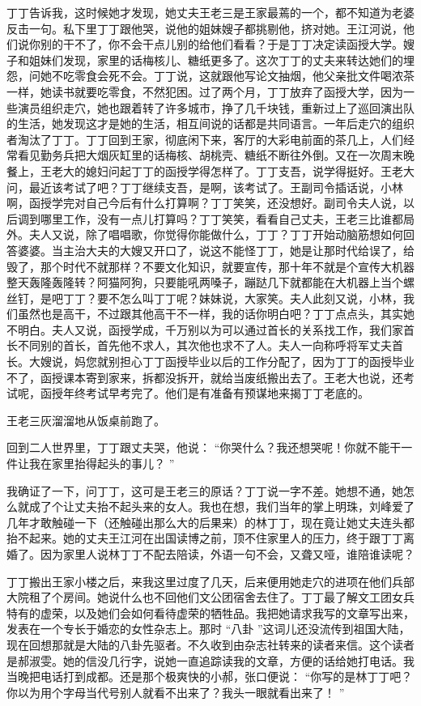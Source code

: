 \documentclass[12pt,twoside,openany]{book}
\begin{document}
丁丁告诉我，这时候她才发现，她丈夫王老三是王家最蔫的一个，都不知道为老婆反击一句。私下里丁丁跟他哭，说他的姐妹嫂子都挑剔他，挤对她。王江河说，他们说你别的干不了，你不会干点儿别的给他们看看？于是丁丁决定读函授大学。嫂子和姐妹们发现，家里的话梅核儿、糖纸更多了。这次丁丁的丈夫来转达她们的埋怨，问她不吃零食会死不会。丁丁说，这就跟他写论文抽烟，他父亲批文件喝浓茶一样，她读书就要吃零食，不然犯困。过了两个月，丁丁放弃了函授大学，因为一些演员组织走穴，她也跟着转了许多城市，挣了几千块钱，重新过上了巡回演出队的生活，她发现这才是她的生活，相互间说的话都是共同语言。一年后走穴的组织者淘汰了丁丁。丁丁回到王家，彻底闲下来，客厅的大彩电前面的茶几上，人们经常看见勤务兵把大烟灰缸里的话梅核、胡桃壳、糖纸不断往外倒。又在一次周末晚餐上，王老大的媳妇问起丁丁的函授学得怎样了。丁丁支吾，说学得挺好。王老大问，最近该考试了吧？丁丁继续支吾，是啊，该考试了。王副司令插话说，小林啊，函授学完对自己今后有什么打算啊？丁丁笑笑，还没想好。副司令夫人说，以后调到哪里工作，没有一点儿打算吗？丁丁笑笑，看看自己丈夫，王老三比谁都局外。夫人又说，除了唱唱歌，你觉得你能做什么，丁丁？丁丁开始动脑筋想如何回答婆婆。当主治大夫的大嫂又开口了，说这不能怪丁丁，她是让那时代给误了，给毁了，那个时代不就那样？不要文化知识，就要宣传，那十年不就是个宣传大机器整天轰隆轰隆转？阿猫阿狗，只要能吼两嗓子，蹦跶几下就都能在大机器上当个螺丝钉，是吧丁丁？要不怎么叫丁丁呢？妹妹说，大家笑。夫人此刻又说，小林，我们虽然也是高干，不过跟其他高干不一样，我的话你明白吧？丁丁点点头，其实她不明白。夫人又说，函授学成，千万别以为可以通过首长的关系找工作，我们家首长不同别的首长，首先他不求人，其次他也求不了人。夫人一向称呼将军丈夫首长。大嫂说，妈您就别担心丁丁函授毕业以后的工作分配了，因为丁丁的函授毕业不了，函授课本寄到家来，拆都没拆开，就给当废纸搬出去了。王老大也说，还考试呢，函授年终考试早考完了。他们是有准备有预谋地来揭丁丁老底的。

王老三灰溜溜地从饭桌前跑了。

回到二人世界里，丁丁跟丈夫哭，他说： “你哭什么？我还想哭呢！你就不能干一件让我在家里抬得起头的事儿？ ”

我确证了一下，问丁丁，这可是王老三的原话？丁丁说一字不差。她想不通，她怎么就成了个让丈夫抬不起头来的女人。我也在想，我们当年的掌上明珠，刘峰爱了几年才敢触碰一下（还触碰出那么大的后果来）的林丁丁，现在竟让她丈夫连头都抬不起来。她的丈夫王江河在出国读博之前，顶不住家里人的压力，终于跟丁丁离婚了。因为家里人说林丁丁不配去陪读，外语一句不会，又聋又哑，谁陪谁读呢？

丁丁搬出王家小楼之后，来我这里过度了几天，后来便用她走穴的进项在他们兵部大院租了个房间。她说什么也不回他们文公团宿舍去住了。丁丁最了解文工团女兵特有的虚荣，以及她们会如何看待虚荣的牺牲品。我把她请求我写的文章写出来，发表在一个专长于婚恋的女性杂志上。那时 “八卦 ”这词儿还没流传到祖国大陆，现在回想那就是大陆的八卦先驱者。不久收到由杂志社转来的读者来信。这个读者是郝淑雯。她的信没几行字，说她一直追踪读我的文章，方便的话给她打电话。我当晚把电话打到成都。还是那个极爽快的小郝，张口便说： “你写的是林丁丁吧？你以为用个字母当代号别人就看不出来了？我头一眼就看出来了！ ”
\end{document}
